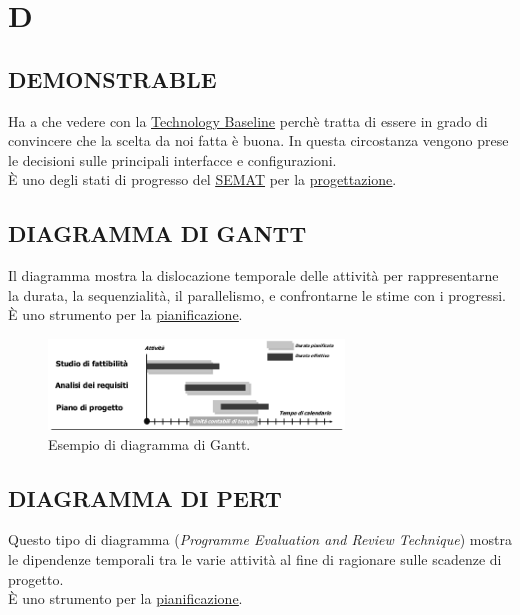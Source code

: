 \newpage
	\section{D} \label{sec:D}

		\subsection{DEMONSTRABLE}		\label{demonstrable}
		Ha  a che vedere con la \underline{\hyperref[technologybaseline]{Technology Baseline}} perchè tratta di essere in grado di convincere che la scelta da noi fatta è buona. In questa circostanza vengono prese le decisioni sulle principali interfacce e configurazioni. \\
		È uno degli stati di progresso del \underline{\hyperref[semat]{SEMAT}} per la \underline{\hyperref[progettazione]{progettazione}}.


		\subsection{DIAGRAMMA DI GANTT}  \label{gantt}
		Il diagramma mostra la dislocazione temporale delle attività per rappresentarne la durata, la sequenzialità, il parallelismo, e confrontarne le stime con i progressi. \\
		È uno strumento per la \underline{\hyperref[pianificazione]{pianificazione}}.

		\begin{figure}[H]
			\centering
			\includegraphics[width=0.7\textwidth]{img/gantt}
			\caption{Esempio di diagramma di Gantt.}
		\end{figure}


		\subsection{DIAGRAMMA DI PERT}  \label{pert}
		Questo tipo di diagramma (\textit{Programme Evaluation and Review Technique}) mostra le dipendenze temporali tra le varie attività al fine di ragionare sulle scadenze di progetto.\\
		È uno strumento per la \underline{\hyperref[pianificazione]{pianificazione}}.

